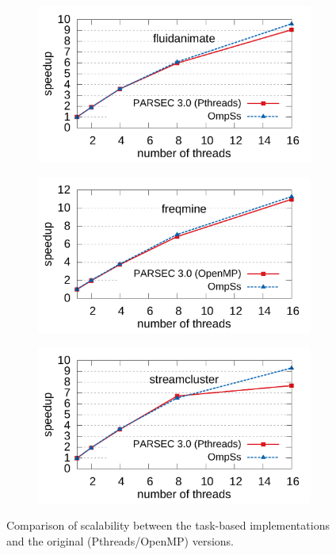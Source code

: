 \begin{figure}[p]
				\centering
				\begin{subfigure}[b]{0.8\textwidth}
                \includegraphics[width=\textwidth]{ifcg/figures/fluidanimate_scale}
                \label{fig:fluidanimate_scale}
        \end{subfigure}
\hfill
        \begin{subfigure}[b]{0.8\textwidth}
                \includegraphics[width=\textwidth]{ifcg/figures/freqmine_scale}
                \label{fig:freqmine_scale}
        \end{subfigure}
\hfill        
				\begin{subfigure}[b]{0.8\textwidth}
                \includegraphics[width=\textwidth]{ifcg/figures/streamcluster_scale}
                \label{fig:streamcluster_scale}
        \end{subfigure}
			\caption{Comparison of scalability between the task-based implementations and the original (Pthreads/OpenMP) versions.}
			\label{fig:scalability_graphs_3}
\end{figure}

